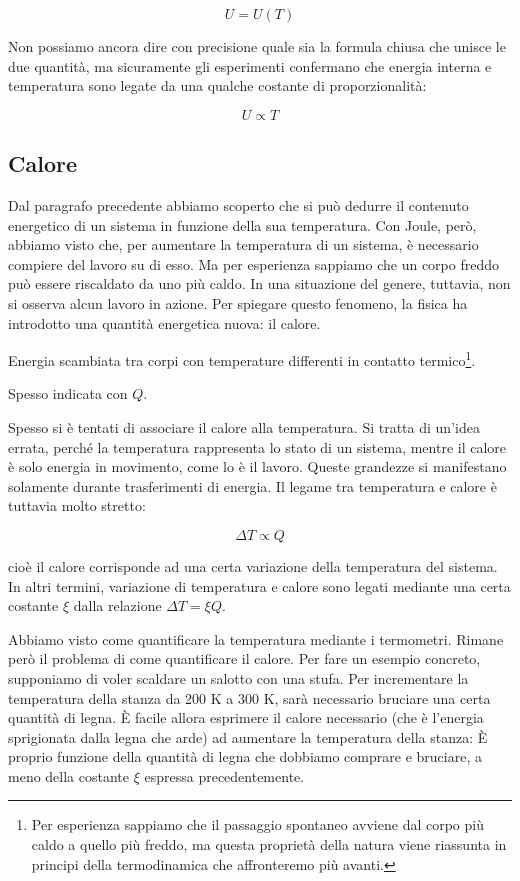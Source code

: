 \[ U = U(T) \]

\noindent Non possiamo ancora dire con precisione quale sia
la formula chiusa che unisce le due quantità, ma sicuramente
gli esperimenti confermano che energia interna e temperatura
sono legate da una qualche costante di proporzionalità:

\[ U \propto T \]

\subsection{Calore}
Dal paragrafo precedente abbiamo scoperto che si può dedurre il
contenuto energetico di un sistema in funzione della sua temperatura.
Con Joule, però, abbiamo visto che, per aumentare la temperatura di
un sistema, è necessario compiere del lavoro su di esso. Ma per
esperienza sappiamo che un corpo freddo può essere riscaldato da uno
più caldo. In una situazione del genere, tuttavia, non si osserva alcun lavoro in azione. Per
spiegare questo fenomeno, la fisica ha introdotto una quantità
energetica nuova: il calore.

\begin{tcolorbox}[colback = red!30, colframe = red!30!black, title = {Calore}]
Energia scambiata tra corpi con temperature differenti in contatto termico\footnote{Per esperienza sappiamo che il passaggio spontaneo avviene
dal corpo più caldo a quello più freddo, ma questa proprietà della natura viene riassunta in principi della termodinamica che affronteremo più avanti.}.

Spesso indicata con $Q$.
\end{tcolorbox}

Spesso si è tentati di associare il calore alla temperatura. Si
tratta di un'idea errata, perché la temperatura rappresenta lo
stato di un sistema, mentre il calore è solo energia in movimento,
come lo è il lavoro. Queste grandezze si manifestano solamente
durante trasferimenti di energia. Il legame tra temperatura e calore
è tuttavia molto stretto:

\[ \Delta T \propto Q \]

\noindent cioè il calore corrisponde ad una certa variazione della temperatura
del sistema. In altri termini, variazione di temperatura e calore sono legati
mediante una certa costante $\xi$ dalla relazione $\Delta T = \xi Q$.

Abbiamo visto come quantificare la temperatura mediante i termometri. Rimane
però il problema di come quantificare il calore. Per fare un
esempio concreto, supponiamo di voler scaldare un salotto con una stufa. Per
incrementare la temperatura della stanza da 200 K a 300 K, sarà necessario
bruciare una certa quantità di legna. È facile allora esprimere il calore
necessario (che è l'energia sprigionata dalla legna che arde) ad aumentare
la temperatura della stanza: È proprio funzione della quantità di legna che dobbiamo
comprare e bruciare, a meno della costante $\xi$ espressa precedentemente.

